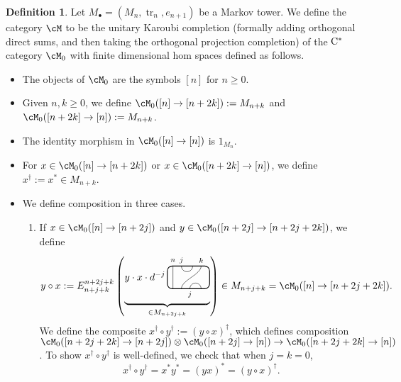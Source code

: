 \documentclass[11pt]{article}
\theoremstyle{plain}
\theoremstyle{definition}
\newtheorem{defn}[thm]{Definition}
\DeclareMathOperator{\tr}{tr}
\newcommand{\set}[2]{\left\{#1 \middle| #2\right\}}
\newcommand{\Cstar}{\rm{C^*}}
\newcommand{\nn}[1]{\textcolor{red}{[[#1]]}}
\begin{document}
\begin{defn}
\label{def:MarkovProjections}
Let $M_\bullet = (M_n, \tr_n, e_{n+1})$ be a Markov tower.
We define the category $\cM$ to be the unitary Karoubi completion (formally adding orthogonal direct sums, and then taking the orthogonal projection completion) of the $\Cstar$ category $\cM_0$ with finite dimensional hom spaces defined as follows.
\begin{itemize}
\item
The objects of $\cM_0$ are the symbols $[n]$ for $n\geq 0$.
\item
Given $n,k \geq 0$, we define 
$\cM_0([n] \to [n+2k]):= M_{n+k}$
and
$\cM_0([n+2k] \to [n]) := M_{n+k}$.
\item
The identity morphism in $\cM_0([n] \to [n])$ is $1_{M_n}$.
\item
For $x\in \cM_0([n]\to [n+2k])$ or $x\in \cM_0([n+2k] \to [n])$, we define $x^\dag := x^* \in M_{n+k}$.
%
\item
We define composition in three cases.
\begin{enumerate}[label={\rm(C\arabic*)}]
\item
\label{compose:upup}
If $x\in \cM_0([n] \to [n+2j])$ and $y\in \cM_0([n+2j] \to [n+2j+2k])$, we define 
$$
y\circ x
:=
E^{n+2j+k}_{n+j+k}
\left(
\raisebox{.3cm}{$
\underbrace{
y\cdot x \cdot
d^{-j}\,
\begin{tikzpicture}[baseline = .3cm]
	\draw[thick, rounded corners = 5pt] (0,0) rectangle (1.5,.8);
	\draw (.2,0) -- (.2,.8);
	\draw (.5,.8) arc (-180:0:.2cm);
	\draw (.5,0) .. controls ++(90:.3cm) and ++(270:.3cm) .. (1.2,.8);
	\draw (.8,0) arc (180:0:.2cm);
	\node at (.2,1) {\scriptsize{$n$}};
	\node at (.5,1) {\scriptsize{$j$}};
	\node at (1.2,1) {\scriptsize{$k$}};
	\node at (.8,-.2) {\scriptsize{$j$}};
\end{tikzpicture}
}_{\in M_{n+2j+k}}
$}
\right)
\in M_{n+j+k}
=
\cM_0([n] \to [n+2j+2k]).
$$
We define the composite $x^\dag \circ y^\dag := (y\circ x)^\dag$, which defines composition 
$\cM_0([n+2j+2k] \to [n+2j]) \otimes \cM_0([n+2j] \to [n]) \to \cM_0([n+2j+2k] \to [n])$.
To show $x^\dag \circ y^\dag$ is well-defined, we check that when $j=k=0$,
\begin{equation}
\label{eq:n to n to n}
x^\dag\circ y^\dag= x^* y^* = (y x)^* = (y\circ x)^\dag.
\end{equation}


\end{enumerate}
\end{itemize}
\end{defn}
\end{document}
